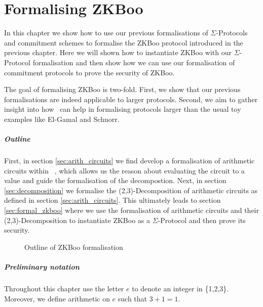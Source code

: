 \chapter{Formalising ZKBoo}
\label{ch:formal_zkboo}
In this chapter we show how to use our previous formalisations of
$\Sigma$-Protocols and commitment schemes to formalise the ZKBoo protocol
introduced in the previous chapter.
Here we will shown how to instantiate ZKBoo with our $\Sigma$-Protocol
formalisation and then show how we can use our formalisation of commitment
protocols to prove the security of ZKBoo.

The goal of formalising ZKBoo is two-fold. First, we show that our previous
formalisations are indeed applicable to larger protocols. Second, we aim to
gather insight into how \easycrypt\ can help in formalising protocols larger
than the usual toy examples like El-Gamal and Schnorr.

\paragraph{Outline}
First, in section \ref{sec:arith_circuits} we find develop a formalisation of
arithmetic circuits within \easycrypt\ , which allows us the reason about
evaluating the circuit to a value and guide the formalisation of the
decompostion. Next, in section \ref{sec:decomposition} we formalise the
(2,3)-Decomposition of arithmetic circuits as defined in section
\ref{sec:arith_circuits}.
This ultimately leads to section \ref{sec:formal_zkboo} where we use the
formalisation of arithmetic circuits and their (2,3)-Decomposition to
instantiate ZKBoo as a $\Sigma$-Protocol and then prove its security.


\begin{figure}[ht]
  \centering
  \caption{\label{fig:outline_zkboo} Outline of ZKBoo formalisation}
\end{figure}

\paragraph{Preliminary notation}
Throughout this chapter use the letter $e$ to denote an integer in \{1,2,3\}.
Moreover, we define arithmetic on $e$ such that $3+1 = 1$.

